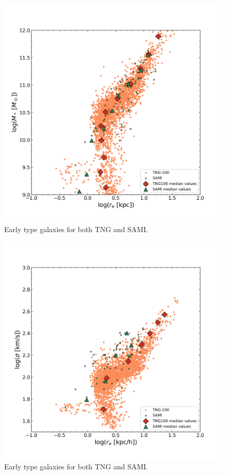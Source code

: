 \begin{figure}
    \centering
    \includegraphics[width=\textwidth]{images/results_mass_radius_FP.png}
    \caption{Early type galaxies for both TNG and SAMI.}
    \label{FP_res1}
\end{figure}

\begin{figure}
    \centering
    \includegraphics[width=\textwidth]{images/results_sigma_radius_FP.png}
    \caption{Early type galaxies for both TNG and SAMI.}
    \label{FP_res2}
\end{figure}

